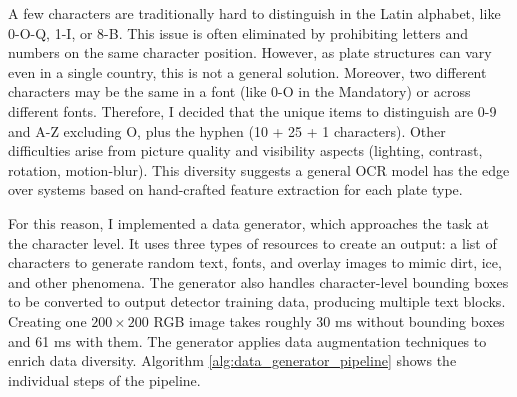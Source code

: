 A few characters are traditionally hard to distinguish in the Latin alphabet, like 0-O-Q, 1-I, or 8-B. This issue is often eliminated by prohibiting letters and numbers on the same character position. However, as plate structures can vary even in a single country, this is not a general solution. Moreover, two different characters may be the same in a font (like 0-O in the Mandatory) or across different fonts. Therefore, I decided that the unique items to distinguish are 0-9 and A-Z excluding O, plus the hyphen (10 + 25 + 1 characters). Other difficulties arise from picture quality and visibility aspects (lighting, contrast, rotation, motion-blur). This diversity suggests a general OCR model has the edge over systems based on hand-crafted feature extraction for each plate type.

For this reason, I implemented a data generator, which approaches the task at the character level. It uses three types of resources to create an output: a list of characters to generate random text, fonts, and overlay images to mimic dirt, ice, and other phenomena. The generator also handles character-level bounding boxes to be converted to output detector training data, producing multiple text blocks. Creating one $200\times200$ RGB image takes roughly 30 ms without bounding boxes and 61 ms with them. The generator applies data augmentation techniques to enrich data diversity. Algorithm \ref{alg:data_generator_pipeline} shows the individual steps of the pipeline.

